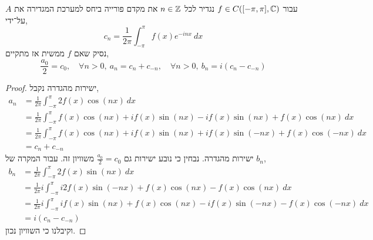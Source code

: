 \subquestion{}
עבור $f \in C([-\pi, \pi], \mathbb{C})$ נגדיר לכל $n \in \mathbb{Z}$ את מקדם פורייה ביחס למערכת המגדירה את $A$ על־ידי,
\[
	c_n
	= \frac{1}{2 \pi} \int_{-\pi}^{\pi} f(x) e^{-i n x}\ dx
\]
נסיק שאם $f$ ממשית אז מתקיים,
\[
	\frac{a_0}{2} = c_0,
	\quad
	\forall n > 0,\ a_n = c_n + c_{-n},
	\quad
	\forall n > 0,\ b_n = i(c_n - c_{-n})
\]
\begin{proof}
	ישירות מהגדרה נקבל,
	\begin{align*}
		a_n
		& = \frac{1}{2 \pi} \int_{-\pi}^{\pi} 2 f(x) \cos(nx)\ dx \\
		& = \frac{1}{2 \pi} \int_{-\pi}^{\pi} f(x) \cos(nx) + i f(x) \sin(nx) - i f(x) \sin(nx) + f(x) \cos(nx)\ dx \\
		& = \frac{1}{2 \pi} \int_{-\pi}^{\pi} f(x) \cos(nx) + i f(x) \sin(nx) + i f(x) \sin(-nx) + f(x) \cos(-nx)\ dx \\
		& = c_n + c_{-n}
	\end{align*}
	ישירות מהגדרה.
	נבחין כי נובע ישירות גם $\frac{a_0}{2} = c_0$ משוויון זה.
	עבור המקרה של $b_n$,
	\begin{align*}
		b_n
		& = \frac{1}{2 \pi} \int_{-\pi}^{\pi} 2 f(x) \sin(nx)\ dx \\
		& = \frac{1}{2 \pi} i \int_{-\pi}^{\pi} i 2 f(x) \sin(-nx) + f(x) \cos(nx) - f(x) \cos(nx)\ dx \\
		& = \frac{1}{2 \pi} i \int_{-\pi}^{\pi} i f(x) \sin(nx) + f(x) \cos(nx) - i f(x) \sin(-nx) - f(x) \cos(-nx)\ dx \\
		& = i(c_n - c_{-n})
	\end{align*}
	וקיבלנו כי השוויון נכון.
\end{proof}


